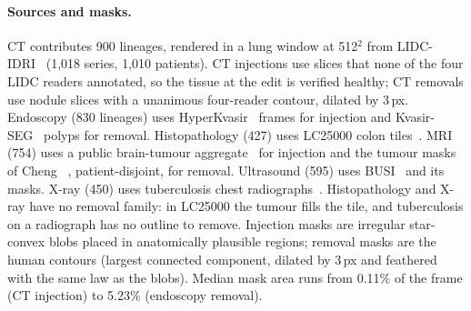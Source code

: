 \paragraph{Sources and masks.}
CT contributes 900 lineages, %
rendered in a lung window at 512$^2$ from LIDC-IDRI~\cite{armato2011lidc} (1,018 series, 1,010 patients). %
CT injections use slices that none of the four LIDC readers annotated, so the tissue at the edit is verified healthy; CT removals use nodule slices with a unanimous four-reader contour, dilated by 3\,px. %
Endoscopy (830 lineages) %
uses HyperKvasir~\cite{borgli2020hyperkvasir} frames for injection and Kvasir-SEG~\cite{jha2020kvasirseg} polyps for removal.
Histopathology (427) %
uses LC25000 colon tiles~\cite{borkowski2019lc25000}.
MRI (754) %
uses a public brain-tumour aggregate~\cite{nickparvar2021brainmri} for injection and the tumour masks of Cheng \etal~\cite{cheng2015brain}, patient-disjoint, for removal.
Ultrasound (595) %
uses BUSI~\cite{aldhabyani2020busi} and its masks.
X-ray (450) %
uses tuberculosis chest radiographs~\cite{rahman2020tb}.
Histopathology and X-ray have no removal family: in LC25000 the tumour fills the tile, and tuberculosis on a radiograph has no outline to remove.
Injection masks are irregular star-convex blobs placed in anatomically plausible regions; removal masks are the human contours (largest connected component, dilated by 3\,px and feathered with the same law as the blobs). %
Median mask area runs from 0.11\% of the frame (CT injection) to 5.23\% (endoscopy removal). %

